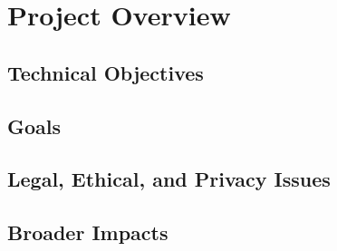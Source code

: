 \section{Project Overview}

\subsection{Technical Objectives}

\blindtext

\subsection{Goals}

\blindtext

\subsection{Legal, Ethical, and Privacy Issues}

\blindtext

\subsection{Broader Impacts}

\blindtext
